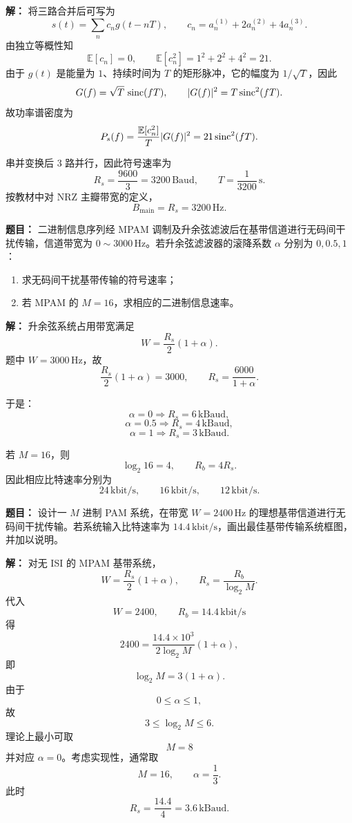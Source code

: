 \par\textbf{解：}
将三路合并后可写为
\[
s(t)=\sum_n c_n g(t-nT),
\qquad
c_n=a_n^{(1)}+2a_n^{(2)}+4a_n^{(3)}.
\]
由独立等概性知
\[
\mathbb{E}[c_n]=0,
\qquad
\mathbb{E}[c_n^2]=1^2+2^2+4^2=21.
\]
由于 $g(t)$ 是能量为 $1$、持续时间为 $T$ 的矩形脉冲，它的幅度为 $1/\sqrt{T}$，因此
\[
G(f)=\sqrt{T}\,\operatorname{sinc}(fT),
\qquad
|G(f)|^2=T\operatorname{sinc}^2(fT).
\]
故功率谱密度为
\[
P_s(f)=\frac{\mathbb{E}[c_n^2]}{T}|G(f)|^2
=21\operatorname{sinc}^2(fT).
\]

串并变换后 3 路并行，因此符号速率为
\[
R_s=\frac{9600}{3}=3200\,\mathrm{Baud},
\qquad
T=\frac{1}{3200}\,\mathrm{s}.
\]
按教材中对 NRZ 主瓣带宽的定义，
\[
B_{\text{main}}=R_s=3200\,\mathrm{Hz}.
\]

\medskip
{}
\textbf{题目：}
二进制信息序列经 MPAM 调制及升余弦滤波后在基带信道进行无码间干扰传输，信道带宽为 $0\sim 3000\,\mathrm{Hz}$。若升余弦滤波器的滚降系数 $\alpha$ 分别为 $0,0.5,1$：
\begin{enumerate}
\item 求无码间干扰基带传输的符号速率；
\item 若 MPAM 的 $M=16$，求相应的二进制信息速率。
\end{enumerate}

\par\textbf{解：}
升余弦系统占用带宽满足
\[
W=\frac{R_s}{2}(1+\alpha).
\]
题中 $W=3000\,\mathrm{Hz}$，故
\[
\frac{R_s}{2}(1+\alpha)=3000,
\qquad
R_s=\frac{6000}{1+\alpha}.
\]

于是：
\[
\alpha=0 \Rightarrow R_s=6\,\mathrm{kBaud},
\]
\[
\alpha=0.5 \Rightarrow R_s=4\,\mathrm{kBaud},
\]
\[
\alpha=1 \Rightarrow R_s=3\,\mathrm{kBaud}.
\]

若 $M=16$，则
\[
\log_2 16=4,
\qquad
R_b=4R_s.
\]
因此相应比特速率分别为
\[
24\,\mathrm{kbit/s},\qquad 16\,\mathrm{kbit/s},\qquad 12\,\mathrm{kbit/s}.
\]

\medskip
{}
\textbf{题目：}
设计一 $M$ 进制 PAM 系统，在带宽 $W=2400\,\mathrm{Hz}$ 的理想基带信道进行无码间干扰传输。若系统输入比特速率为 $14.4\,\mathrm{kbit/s}$，画出最佳基带传输系统框图，并加以说明。

\par\textbf{解：}
对无 ISI 的 MPAM 基带系统，
\[
W=\frac{R_s}{2}(1+\alpha),
\qquad
R_s=\frac{R_b}{\log_2 M}.
\]
代入
\[
W=2400,\qquad R_b=14.4\,\mathrm{kbit/s}
\]
得
\[
2400=\frac{14.4\times 10^3}{2\log_2 M}(1+\alpha),
\]
即
\[
\log_2M=3(1+\alpha).
\]
由于
\[
0\le \alpha\le 1,
\]
故
\[
3\le \log_2M\le 6.
\]
理论上最小可取
\[
M=8
\]
并对应 $\alpha=0$。考虑实现性，通常取
\[
M=16,\qquad \alpha=\frac13.
\]
此时
\[
R_s=\frac{14.4}{4}=3.6\,\mathrm{kBaud}.
\]

